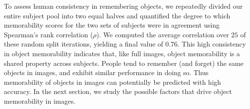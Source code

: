 To assess human consistency in remembering objects, we repeatedly divided our entire subject pool into two equal halves and quantified the degree to which memorability scores for the two sets of subjects were in agreement using Spearman’s rank correlation ($\rho$). We computed the average correlation over $25$ of these random split iterations, yielding a final value of $0.76$. This high consistency in object memorability indicates that, like full images, object memorability is a shared property across subjects. People tend to remember (and forget) the same objects in images, and exhibit similar performance in doing so. Thus memorability of objects in images can potentially be predicted with high accuracy. In the next section, we study the possible factors that drive object memorability in images.

